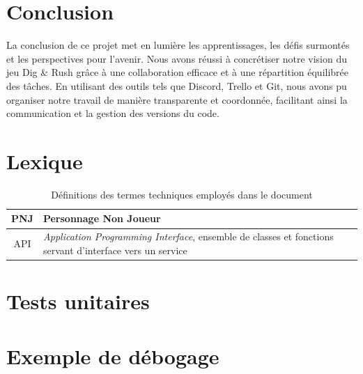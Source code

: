 \documentclass[a4paper,12pt]{article}
\begin{document}
\section{Conclusion}

La conclusion de ce projet met en lumière les apprentissages, les défis surmontés et les perspectives pour l'avenir. Nous avons réussi à concrétiser notre vision du jeu Dig & Rush grâce à une collaboration efficace et à une répartition équilibrée des tâches. En utilisant des outils tels que Discord, Trello et Git, nous avons pu organiser notre travail de manière transparente et coordonnée, facilitant ainsi la communication et la gestion des versions du code.



\newpage
\appendix

\section{Lexique}

\begin{table}[h]
    \centering
    \begin{tabular}{c p{}}
	\toprule
	PNJ		    & Personnage Non Joueur \\
	\midrule
	API \label{def_api} & \textit{Application Programming Interface}, ensemble de classes et fonctions servant d’interface vers un service \\
	\bottomrule
    \end{tabular}
    \caption{Définitions des termes techniques employés dans le document}
\end{table}



\section{Tests unitaires}
\section{Exemple de débogage}

\end{document}
